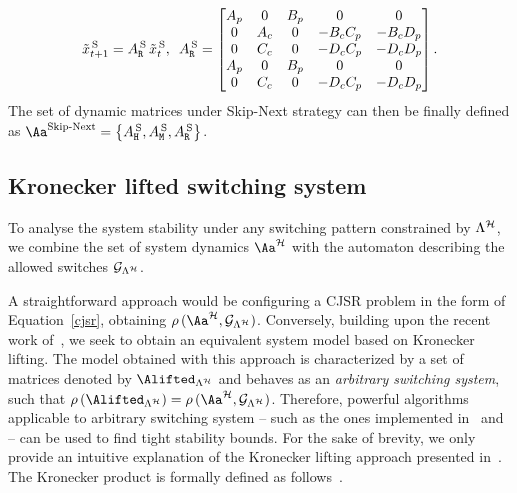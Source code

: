 %
\begin{equation*}
    \tilde x_{t+1}^{\,\text{S}} = A^{\,\text{S}}_{\texttt{R}} \, \tilde x_{t}^{\,\text{S}},\,\,\,
    A^{\,\text{S}}_{\texttt{R}} = \begin{bmatrix}
        A_p & 0    & B_p & 0       & 0 \\
        0   & A_c  & 0   & -B_cC_p & -B_cD_p \\
        0   & C_c  & 0   & -D_cC_p & -D_cD_p \\
        A_p & 0    & B_p & 0       & 0 \\
        0   & C_c  & 0   & -D_cC_p & -D_cD_p \\
    \end{bmatrix}.
\end{equation*}
%
The set of dynamic matrices under Skip-Next strategy can then be finally defined as $\Aa^{\text{Skip-Next}}=\left\{A^{\,\text{S}}_{\cH},A^{\,\text{S}}_{\cM},A^{\,\text{S}}_{\cR}\right\}$.

\subsection{Kronecker lifted switching system}%
\label{sec:system_dynamics}
%
To analyse the system stability under any switching pattern constrained by $\Lambda^{\mathcal{H}}$, we combine the set of system dynamics $\Aa^\strat$ with the automaton describing the allowed switches $\mathcal{G}_{\Lambda^{\mathcal{H}}}$.

A straightforward approach would be configuring a CJSR problem in the form of Equation~\eqref{cjsr}, obtaining $\rho\,(\Aa^\strat,\GG{\Lambda^\strat})$.
%
Conversely, building upon the recent work of~\cite{xu2020approximation}, we seek to obtain an equivalent system model based on Kronecker lifting.
The model obtained with this approach is characterized by a set of matrices denoted by $\Alifted_{\Lambda^\strat}$ and behaves as an \emph{arbitrary switching system}, such that $\rho\,(\Alifted_{\Lambda^\strat})= \rho\,(\Aa^{\strat},\GG{\Lambda^\strat})$.
Therefore, powerful algorithms applicable to arbitrary switching system -- such as the ones implemented in~\cite{vankeerberghen2014jsr} and \cite{sparsejsr} -- can be used to find tight stability bounds.
For the sake of brevity, we only provide an intuitive explanation of the Kronecker lifting approach presented in~\cite{xu2020approximation}.
The Kronecker product is formally defined as follows~\cite{horn2012matrix}.

